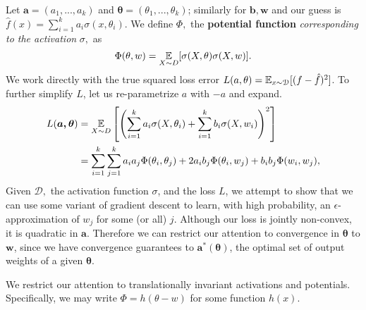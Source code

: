 Let $\boldsymbol{a} = (a_1,...,a_k)$ and $\boldsymbol{\theta} =
(\theta_1,...,\theta_k)$; similarly for $\boldsymbol{b},
\boldsymbol{w}$ and our guess is $\hat{f}(x) = \sum_{i=1}^k a_i
\sigma(x, \theta_i)$. 
We define $\Phi,$ the {\bf potential function} {\it corresponding to the activation
  } $\sigma,$ as
\[\Phi(\theta, w) = \operatorname*{\mathbb{E}}_{X\sim D}[ \sigma(X,\theta) \sigma(X,w)].\]
%
We work directly with the true squared loss error $L(a,\theta)= \operatorname*{\mathbb{E}}_{x \sim \mathcal{D}}[(f - \hat{f})^2]$. To further simplify $L$, let us
re-parametrize $a$ with $-a$ and expand.
%
%
\begin{align}
 L(\boldsymbol{a,\theta})  & = \expt_{X\sim D}\left[ \left(
  \sum_{i=1}^k a_i \sigma(X,\theta_i) + \sum_{i=1}^k
  b_i\sigma(X,w_i)\right)^2\right] \nonumber \\
%
& = \sum_{i=1}^k \sum_{j=1}^k a_i a_j \Phi(\theta_i,\theta_j)+ 2 a_ib_j \Phi(\theta_i,w_j)+ b_i b_j \Phi(w_i,w_j),
 \label{errLoss}
\end{align}
%
Given $\mathcal{D},$ the activation function $\sigma$, and the loss $L$, we attempt to show that we can use some variant of gradient descent to learn, with high probability, an $\epsilon$-approximation of $w_j$ for some (or all) $j$. Although our loss is jointly non-convex, it is quadratic in $\boldsymbol{a}$. Therefore we can restrict our attention to convergence in $\boldsymbol{\theta}$ to $\boldsymbol{w}$, since we have convergence guarantees to $\boldsymbol{a^*(\theta)}$, the optimal set of output weights of a given $\boldsymbol{\theta}$. 








We restrict our attention to translationally invariant activations
and potentials.
%
Specifically, we may write $\Phi= h(\theta-w)$ for some function $h(x).$

